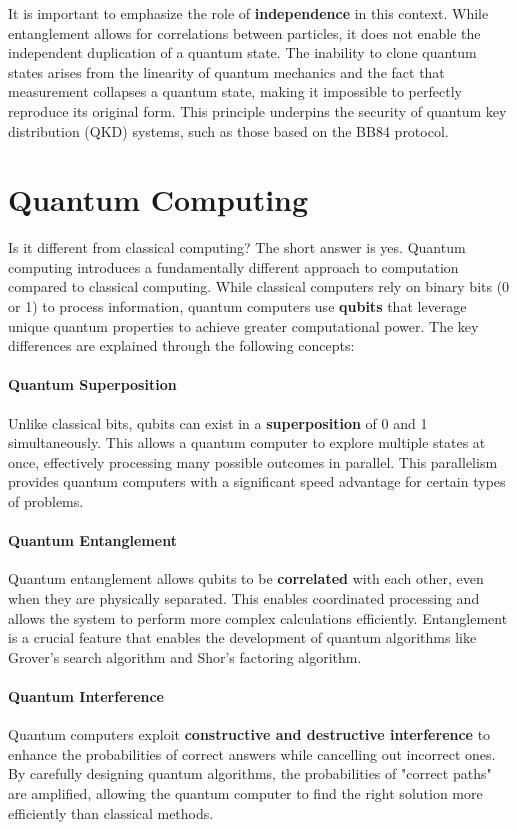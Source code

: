 It is important to emphasize the role of \textbf{independence} in this
context. While entanglement allows for correlations between particles,
it does not enable the independent duplication of a quantum state. The
inability to clone quantum states arises from the linearity of quantum
mechanics and the fact that measurement collapses a quantum state,
making it impossible to perfectly reproduce its original form. This
principle underpins the security of quantum key distribution (QKD)
systems, such as those based on the BB84 protocol.

\section{Quantum Computing}

Is it different from classical computing?  The short answer is yes. 
Quantum computing introduces a fundamentally different approach to
computation compared to classical computing. While classical computers
rely on binary bits (0 or 1) to process information, quantum computers
use \textbf{qubits} that leverage unique quantum properties to achieve
greater computational power. The key differences are explained through
the following concepts:

\paragraph{Quantum Superposition}  
Unlike classical bits, qubits can exist in a \textbf{superposition} of
0 and 1 simultaneously. This allows a quantum computer to explore
multiple states at once, effectively processing many possible outcomes
in parallel. This parallelism provides quantum computers with a
significant speed advantage for certain types of problems.

\paragraph{Quantum Entanglement}  
Quantum entanglement allows qubits to be \textbf{correlated} with each
other, even when they are physically separated. This enables
coordinated processing and allows the system to perform more complex
calculations efficiently. Entanglement is a crucial feature that
enables the development of quantum algorithms like Grover's search
algorithm and Shor's factoring algorithm.

\paragraph{Quantum Interference}  
Quantum computers exploit \textbf{constructive and destructive
interference} to enhance the probabilities of correct answers while
cancelling out incorrect ones. By carefully designing quantum
algorithms, the probabilities of "correct paths" are amplified,
allowing the quantum computer to find the right solution more
efficiently than classical methods.

